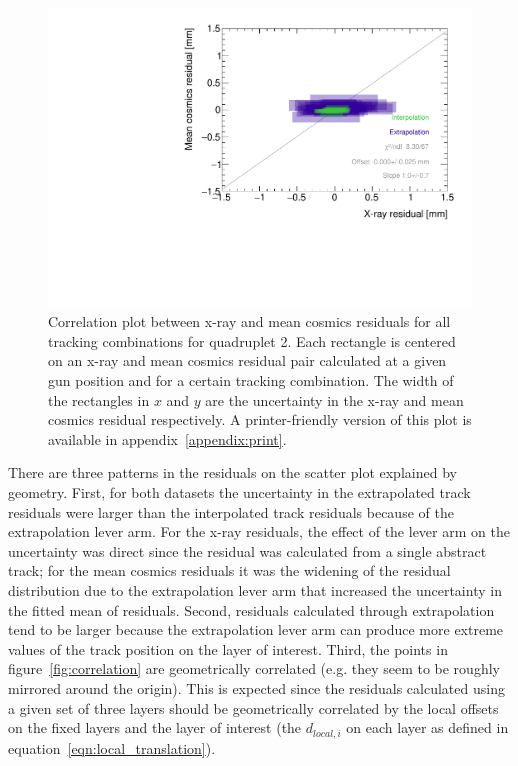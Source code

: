 \begin{figure}
    \centering
    \includegraphics[width = \textwidth]{figures/figure_QL2P08_3100V_2021-08-16_QL2P08_local_cosmic_and_xray_data_correlation_plot.pdf}
    \caption{Correlation plot between x-ray and mean cosmics residuals for all tracking combinations for quadruplet 2. Each rectangle is centered on an x-ray and mean cosmics residual pair calculated at a given gun position and for a certain tracking combination. The width of the rectangles in $x$ and $y$ are the uncertainty in the x-ray and mean cosmics residual respectively. A printer-friendly version of this plot is available in appendix~\ref{appendix:print}.}
    \label{fig:no_correlation}
\end{figure}

There are three patterns in the residuals on the scatter plot explained by geometry. First, for both datasets the uncertainty in the extrapolated track residuals were larger than the interpolated track residuals because of the extrapolation lever arm. For the x-ray residuals, the effect of the lever arm on the uncertainty was direct since the residual was calculated from a single abstract track; for the mean cosmics residuals it was the widening of the residual distribution due to the extrapolation lever arm that increased the uncertainty in the fitted mean of residuals. Second, residuals calculated through extrapolation tend to be larger because the extrapolation lever arm can produce more extreme values of the track position on the layer of interest. Third, the points in figure~\ref{fig:correlation} are geometrically correlated (e.g. they seem to be roughly mirrored around the origin). This is expected since the residuals calculated using a given set of three layers should be geometrically correlated by the local offsets on the fixed layers and the layer of interest (the $d_{local, i}$ on each layer as defined in equation~\ref{eqn:local_translation}). 

